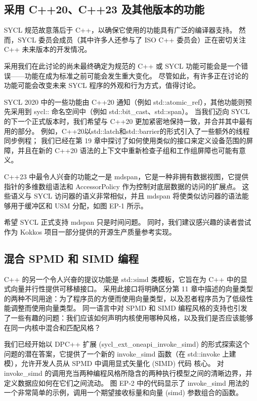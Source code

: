 \subsection{采用 C++20、C++23 及其他版本的功能}
SYCL 规范故意落后于 C++，以确保它使用的功能具有广泛的编译器支持。 然而，SYCL 委员会成员（其中许多人还参与了 ISO C++ 委员会）正在密切关注 C++ 未来版本的开发情况。

采用我们在此讨论的尚未最终确定为规范的 C++ 或 SYCL 功能可能会是一个错误——功能在成为标准之前可能会发生重大变化。 尽管如此，有许多正在讨论的功能可能会改变未来 SYCL 程序的外观和行为方式，值得讨论。

SYCL 2020 中的一些功能由 C++20 通知（例如 std::atomic\_ref），其他功能则预先采用到 sycl:: 命名空间中（例如 std::bit\_cast、std::span）。 当我们迈向 SYCL 的下一个正式版本时，我们希望与 C++20 更加紧密地保持一致，并合并其中最有用的部分。 例如，C++20以std::latch和std::barrier的形式引入了一些额外的线程同步例程； 我们已经在第 19 章中探讨了如何使用类似的接口来定义设备范围的屏障，并且在新的 C++20 语法的上下文中重新检查子组和工作组屏障也可能有意义。

C++23 中最令人兴奋的功能之一是 mdspan，它是一种非拥有数据视图，它提供指针的多维数组语法和 AccessorPolicy 作为控制对底层数据的访问的扩展点。 这些语义与 SYCL 访问器的语义非常相似，并且 mdspan 将使类似访问器的语法能够用于缓冲区和 USM 分配，如图 EP-1 所示。

希望 SYCL 正式支持 mdspan 只是时间问题。 同时，我们建议感兴趣的读者尝试作为 Kokkos 项目一部分提供的开源生产质量参考实现。

\subsection{混合 SPMD 和 SIMD 编程}
C++ 的另一个令人兴奋的提议功能是 std::simd 类模板，它旨在为 C++ 中的显式向量并行性提供可移植接口。 采用此接口将明确区分第 11 章中描述的向量类型的两种不同用途：为了程序员的方便而使用向量类型，以及忍者程序员为了低级性能调整而使用向量类型。 同一语言中对 SPMD 和 SIMD 编程风格的支持也引发了一些有趣的问题：我们应该如何声明内核使用哪种风格，以及我们是否应该能够在同一内核中混合和匹配风格？

我们已经开始以 DPC++ 扩展 (sycl\_ext\_oneapi\_invoke\_simd) 的形式探索这个问题的潜在答案，它提供了一个新的 invoke\_simd 函数（在 std::invoke 上建模），允许开发人员从 SPMD 中调用显式矢量化 (SIMD) 代码 核心。 对invoke\_simd 的调用充当两种编程风格所隐含的两种执行模型之间的清晰边界，并定义数据应如何在它们之间流动。 图 EP-2 中的代码显示了 invoke\_simd 用法的一个非常简单的示例，调用一个期望接收标量和向量 (simd) 参数组合的函数。

